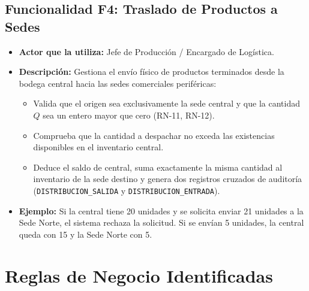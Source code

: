 \documentclass[11pt,a4paper]{article}
\begin{document}
\subsection{Funcionalidad F4: Traslado de Productos a Sedes}
\begin{itemize}
    \item \textbf{Actor que la utiliza:} Jefe de Producción / Encargado de Logística.
    \item \textbf{Descripción:} Gestiona el envío físico de productos terminados desde la bodega central hacia las sedes comerciales periféricas:
    \begin{itemize}
        \item Valida que el origen sea exclusivamente la sede central y que la cantidad $Q$ sea un entero mayor que cero (RN-11, RN-12).
        \item Comprueba que la cantidad a despachar no exceda las existencias disponibles en el inventario central.
        \item Deduce el saldo de central, suma exactamente la misma cantidad al inventario de la sede destino y genera dos registros cruzados de auditoría (\texttt{DISTRIBUCION\_SALIDA} y \texttt{DISTRIBUCION\_ENTRADA}).
    \end{itemize}
    \item \textbf{Ejemplo:} Si la central tiene 20 unidades y se solicita enviar 21 unidades a la Sede Norte, el sistema rechaza la solicitud. Si se envían 5 unidades, la central queda con 15 y la Sede Norte con 5.
\end{itemize}

\section{Reglas de Negocio Identificadas}
\end{document}
